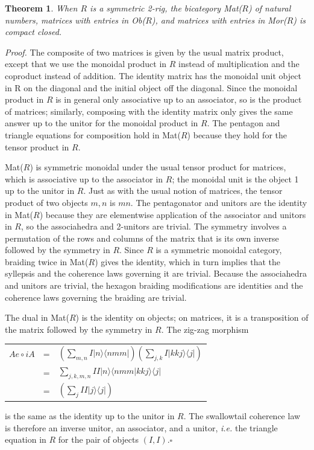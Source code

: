 \documentclass[12pt,twoside,openright]{report}
\newtheorem{thm}{Theorem}
\begin{document}
\begin{thm}
  When $R$ is a symmetric 2-rig, the bicategory Mat($R$) of natural numbers, matrices with entries in Ob($R$), and matrices with entries in Mor($R$) is compact closed.
\end{thm}
{\em Proof.} The composite of two matrices is given by the usual matrix product, except that we use the monoidal product in $R$ instead of multiplication and the coproduct instead of addition.  The identity matrix has the monoidal unit object in R on the diagonal and the initial object off the diagonal.  Since the monoidal product in $R$ is in general only associative up to an associator, so is the product of matrices; similarly, composing with the identity matrix only gives the same answer up to the unitor for the monoidal product in $R$.  The pentagon and triangle equations for composition hold in Mat($R$) because they hold for the tensor product in $R.$

Mat($R$) is symmetric monoidal under the usual tensor product for matrices, which is associative up to the associator in $R$; the monoidal unit is the object 1 up to the unitor in $R$.  Just as with the usual notion of matrices, the tensor product of two objects $m, n$ is $mn$. The pentagonator and unitors are the identity in Mat($R$) because they are elementwise application of the associator and unitors in $R$, so the associahedra and 2-unitors are trivial.  The symmetry involves a permutation of the rows and columns of the matrix that is its own inverse followed by the symmetry in $R$.  Since $R$ is a symmetric monoidal category, braiding twice in Mat($R$) gives the identity, which in turn implies that the syllepsis and the coherence laws governing it are trivial.  Because the associahedra and unitors are trivial, the hexagon braiding modifications are identities and the coherence laws governing the braiding are trivial.

The dual in Mat($R$) is the identity on objects; on matrices, it is a transposition of the matrix followed by the symmetry in $R.$  The zig-zag morphism
\begin{center}
  \begin{tabular}{rcl}
    $Ae \circ iA$ & = & $(\sum_{m,n} I|n\rangle\langle nmm|)(\sum_{j,k}
I|kkj\rangle\langle j|)$ \\
                  & = & $\sum_{j,k,m,n}II|n\rangle\langle nmm|kkj\rangle\langle j|$ \\
                  & = & $(\sum_j II|j\rangle\langle j|)$
  \end{tabular}
\end{center}
is the same as the identity up to the unitor in $R.$  The swallowtail coherence law is therefore an inverse unitor, an associator, and a unitor, {\em i.e.} the triangle equation in $R$ for the pair of objects
$(I, I).$\hfill $\square$
\end{document}
